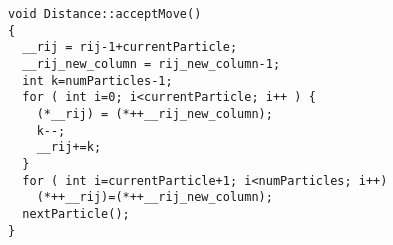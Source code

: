 \begin{verbatim}
void Distance::acceptMove()
{
  __rij = rij-1+currentParticle;
  __rij_new_column = rij_new_column-1;
  int k=numParticles-1;
  for ( int i=0; i<currentParticle; i++ ) {
    (*__rij) = (*++__rij_new_column);
    k--;
    __rij+=k;
  }
  for ( int i=currentParticle+1; i<numParticles; i++)  
    (*++__rij)=(*++__rij_new_column);
  nextParticle();
}
\end{verbatim}
